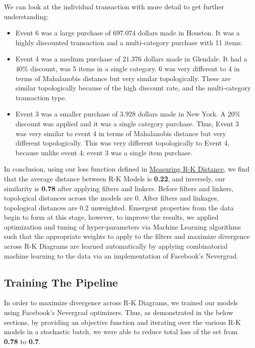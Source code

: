 We can look at the individual transaction with more detail to get further understanding:

\begin{itemize}
\item Event 6 was a large purchase of $697.074$ dollars made in Houston. It was a highly discounted transaction and a multi-category purchase with 11 items.
\item Event 4 was a medium purchase of $21.376$ dollars made in Glendale. It had a $40$\% discount, was 5 items in a single category. 6 was very different to 4 in terms of Mahalanobis distance but very similar topologically. These are similar topologically because of the high discount rate, and the multi-category transaction type.
\item Event 3 was a smaller purchase of $3.928$ dollars made in New York. A $20$\% discount was applied and it was a single category purchase. Thus, Event 3 was very similar to event 4 in terms of Mahalanobis distance but very different topologically. This was very different topologically to Event 4, because unlike event 4; event 3 was a single item purchase.
\end{itemize}

In conclusion, using our loss function defined in \hyperref[sec:rk_distance]{Measuring R-K Distance}, we find that the average distance between R-K Models is \textbf{0.22}, and inversely, our similarity is \textbf{0.78} after applying filters and linkers. Before filters and linkers, topological distances across the models are 0. After filters and linkages, topological distances are 0.2 unweighted. Emergent properties from the data begin to form at this stage, however, to improve the results, we applied optimization and tuning of hyper-parameters via Machine Learning algorithms such that the appropriate weights to apply to the filters and maximize divergence across R-K Diagrams are learned automatically by applying combinatorial machine learning to the data via an implementation of Facebook's Nevergrad.\cite{a2020_nevergrad}

\subsection{Training The Pipeline}

In order to maximize divergence across R-K Diagrams, we trained our models using Facebook's Nevergrad \cite{a2020_nevergrad} optimizers. Thus, as demonstrated in the below sections, by providing an objective function and iterating over the various R-K models in a stochastic batch, we were able to reduce total loss of the set from \textbf{0.78} to \textbf{0.7}.

